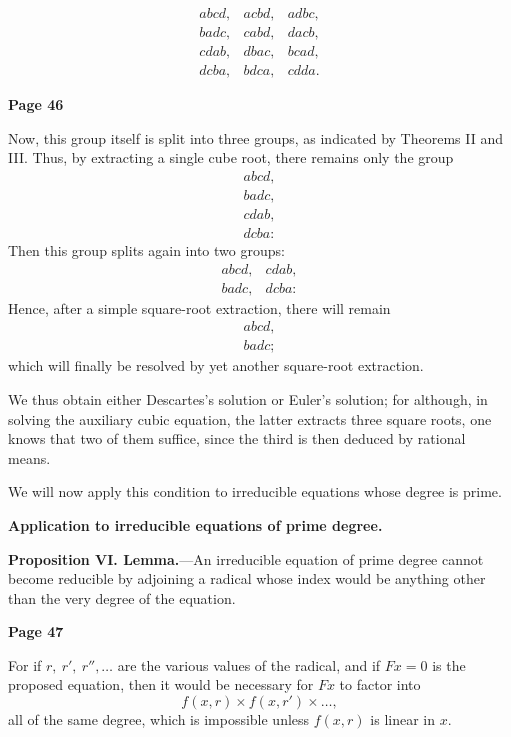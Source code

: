\documentclass{article}
\begin{document}
\[
\begin{matrix}
abcd, & acbd, & adbc,\\ 
badc, & cabd, & dacb,\\ 
cdab, & dbac, & bcad,\\ 
dcba, & bdca, & cdda.
\end{matrix}
\]

\bigskip\bigskip




\textbf{Page 46}

Now, this group itself is split into three groups, as indicated by Theorems II and III. Thus, by extracting a single cube root, there remains only the group
\[
\begin{matrix}
abcd,\\ badc,\\ cdab,\\
dcba:
\end{matrix}
\]
Then this group splits again into two groups:
\[
\begin{matrix}
abcd, & cdab,\\ badc, & dcba:
\end{matrix}
\]
Hence, after a simple square-root extraction, there will remain
\[
\begin{matrix}
abcd,\\ badc;
\end{matrix}
\]
which will finally be resolved by yet another square-root extraction.

We thus obtain either Descartes's solution or Euler's solution; for although, in solving the auxiliary cubic equation, the latter extracts three square roots, one knows that two of them suffice, since the third is then deduced by rational means.

We will now apply this condition to irreducible equations whose degree is prime.

\textbf{Application to irreducible equations of prime degree.}

\textbf{Proposition VI. Lemma.}---An irreducible equation of prime degree cannot become reducible by adjoining a radical whose index would be anything other than the very degree of the equation.

\bigskip

\textbf{Page 47}

For if $r,\ r',\ r'',\dots$ are the various values of the radical, and if $Fx = 0$ is the proposed equation, then it would be necessary for $Fx$ to factor into
\[
f(x,r)\times f(x,r')\times \dots,
\]
all of the same degree, which is impossible unless $f(x,r)$ is linear in $x$. 
\end{document}
